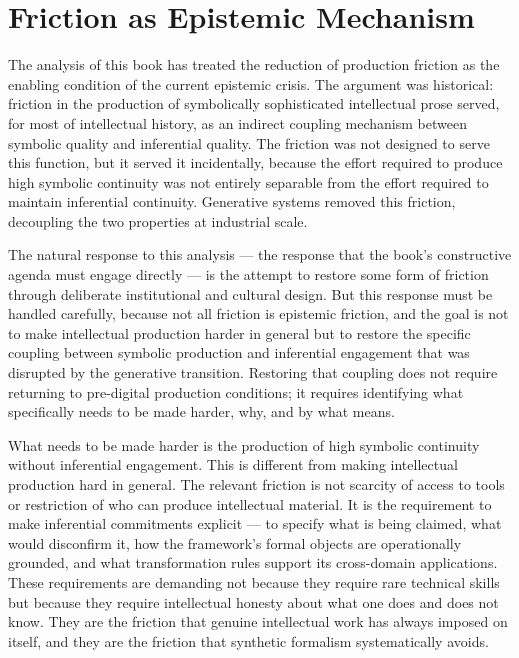 \documentclass[12pt, openright, twoside]{book}
\begin{document}
\section{Friction as Epistemic Mechanism}

The analysis of this book has treated the reduction of production friction
as the enabling condition of the current epistemic crisis. The argument was
historical: friction in the production of symbolically sophisticated intellectual
prose served, for most of intellectual history, as an indirect coupling
mechanism between symbolic quality and inferential quality. The friction
was not designed to serve this function, but it served it incidentally,
because the effort required to produce high symbolic continuity was not
entirely separable from the effort required to maintain inferential continuity.
Generative systems removed this friction, decoupling the two properties
at industrial scale.

The natural response to this analysis --- the response that the book's
constructive agenda must engage directly --- is the attempt to restore
some form of friction through deliberate institutional and cultural design.
But this response must be handled carefully, because not all friction is
epistemic friction, and the goal is not to make intellectual production
harder in general but to restore the specific coupling between symbolic
production and inferential engagement that was disrupted by the generative
transition. Restoring that coupling does not require returning to pre-digital
production conditions; it requires identifying what specifically needs to
be made harder, why, and by what means.

What needs to be made harder is the production of high symbolic continuity
without inferential engagement. This is different from making intellectual
production hard in general. The relevant friction is not scarcity of access
to tools or restriction of who can produce intellectual material. It is
the requirement to make inferential commitments explicit --- to specify
what is being claimed, what would disconfirm it, how the framework's formal
objects are operationally grounded, and what transformation rules support
its cross-domain applications. These requirements are demanding not because
they require rare technical skills but because they require intellectual
honesty about what one does and does not know. They are the friction that
genuine intellectual work has always imposed on itself, and they are the
friction that synthetic formalism systematically avoids.
\end{document}
